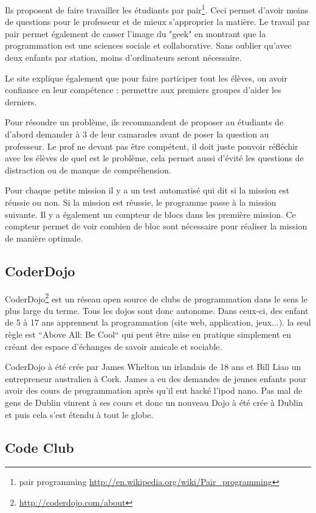 Ils proposent de faire travailler les étudiants par pair\footnote{pair programming \url{http://en.wikipedia.org/wiki/Pair\_programming}}. Ceci permet d'avoir moins de questions pour le professeur et de mieux s'approprier la matière. Le travail par pair permet également de casser l'image du "geek" en montrant que la programmation est une sciences sociale et collaborative. Sans oublier qu'avec deux enfants par station, moins d'ordinateurs seront nécessaire.

Le site explique également que pour faire participer tout les élèves, on avoir confiance en leur compétence : permettre aux premiers groupes d'aider les derniers.

Pour résoudre un problème, ils recommandent de proposer au étudiants de d'abord demander à 3 de leur camarades avant de poser la question au professeur. Le prof ne devant pas être compétent, il doit juste pouvoir réfléchir avec les élèves de quel est le problème, cela permet aussi d'évité les questions de distraction ou de manque de compréhension.

Pour chaque petite mission il y a un test automatisé qui dit si la mission est réussie ou non. Si la mission est réussie, le programme passe à la mission suivante. Il y a également un compteur de blocs dans les première mission. Ce compteur permet de voir combien de bloc sont nécessaire pour réaliser la mission de manière optimale.

\subsection{CoderDojo}
CoderDojo\footnote{\url{http://coderdojo.com/about}} est un réseau open source de clubs de programmation dans le sens le plus large du terme. Tous les dojos sont donc autonome.  Dans ceux-ci, des enfant de 5 à 17 ans apprennent la programmation (site web, application, jeux...). la seul règle est  “Above All: Be Cool“ qui peut être mise en pratique simplement en créant des espace d'échanges de savoir amicale et sociable.

CoderDojo à été crée par James Whelton un irlandais de 18 ans et Bill Liao un entrepreneur australien à Cork. James a eu des demandes de jeunes enfants pour avoir des cours de programmation après qu'il eut hacké l'ipod nano. Pas mal de gens de Dublin vinrent à ses cours et donc un nouveau Dojo à été crée à Dublin et puis cela s'est étendu à tout le globe.

\subsection{Code Club}

